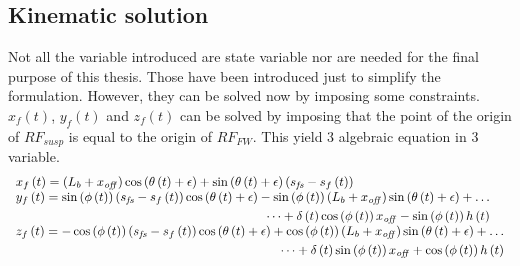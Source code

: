 \subsection{Kinematic solution}
%
Not all the variable introduced are state variable nor are needed for the final purpose of this thesis. Those have been introduced just to simplify the formulation. However, they can be solved now by imposing some constraints.
$x_f(t)$, $y_f(t)$ and $z_f(t)$ can be solved by imposing that the point of the origin of $RF_{susp}$ is equal to the origin of $RF_{FW}$. This yield 3 algebraic equation in 3 variable.\\
%
\footnotesize
\begin{equation}
    \begin{array}{l} 
        x_{f} \left( t \right) = \left( L_{b}+x_{{
        \it off}} \right) \cos \left( \theta \left( t \right) +\epsilon
         \right) +\sin \left( \theta \left( t \right) +\epsilon \right) 
         \left( s_{{\it fs}}-s_{f} \left( t \right)  \right) \\ 
         \begin{split}
         y_{f} \left( t \right) =\sin \left( \phi \left( t
         \right)  \right)  \left( s_{{\it fs}}-s_{f} \left( t \right) 
         \right) \cos \left( \theta \left( t \right) +\epsilon \right) -\sin
         \left( \phi \left( t \right)  \right)  \left( L_{b}+x_{{\it off}}
         \right) \sin \left( \theta \left( t \right) +\epsilon \right) + \dots 
         \\ \dots +\delta
         \left( t \right) \cos \left( \phi \left( t \right)  \right) x_{{\it 
        off}}-\sin \left( \phi \left( t \right)  \right) h \left( t \right) 
        \end{split} \\ 
        \begin{split}
        z_{f} \left( t \right) =-\cos \left( \phi \left( 
        t \right)  \right)  \left( s_{{\it fs}}-s_{f} \left( t \right) 
         \right) \cos \left( \theta \left( t \right) +\epsilon \right) +\cos
         \left( \phi \left( t \right)  \right)  \left( L_{b}+x_{{\it off}}
         \right) \sin \left( \theta \left( t \right) +\epsilon \right) + \dots
         \\ \dots +\delta
         \left( t \right) \sin \left( \phi \left( t \right)  \right) x_{{\it 
        off}}+\cos \left( \phi \left( t \right)  \right) h \left( t \right) 
        \end{split}
    \end{array}       
\end{equation}
